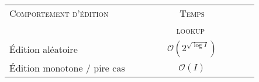
\small
\begin{tabularx}{0.7\textwidth}{@{}Xc@{}}
  \toprule
  \textsc{Comportement d'édition} & \textsc{Temps} \\
  & \ \ \ \ \ \ \ \ \ \textsc{lookup} \ \ \ \ \ \ \ \ \ \\ \midrule
  Édition aléatoire & $\mathcal{O}(2^{\sqrt{\log I}})$ \\
  Édition monotone / pire cas & $\mathcal{O}(I)$ \\ \bottomrule
\end{tabularx}

